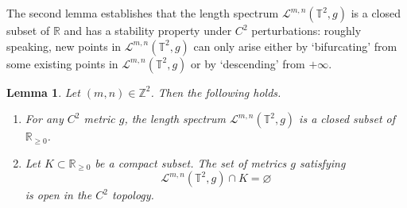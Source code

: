 \documentclass[11pt,letterpaper,oneside]{amsart}
\newcommand{\Z}{\mathbb{Z}}
\newcommand{\R}{\mathbb{R}}
\newcommand{\T}{\mathbb{T}}
\newtheorem{lemm}[theo]{Lemma}
\theoremstyle{definition}
\theoremstyle{remark}
\theoremstyle{definition}
\theoremstyle{remark}
\newcommand{\CL}{\mathcal{L}}
\begin{document}
The second lemma establishes that the length spectrum $\CL^{m,n}(\T^2, g)$ is a closed subset of $\R$ and has a stability property under $C^2$ perturbations: roughly speaking, new points in $\CL^{m,n}(\T^2, g)$ can only arise either by `bifurcating' from some existing points in $\CL^{m,n}(\T^2, g)$ or by `descending' from $+\infty$.

\begin{lemm}\label{lem:LSP stability}
    Let $(m,n) \in \Z^2$. 
    Then the following holds.
    \begin{enumerate}
        \item For any $C^2$ metric $g$, the length spectrum $\CL^{m,n}(\T^2, g)$ is a closed subset of $\R_{\geq 0}$.
        \item Let $K \subset \R_{\geq 0}$ be a compact subset. The set of metrics $g$ satisfying
        \begin{equation*}
            \CL^{m,n}(\T^2, g) \cap K = \varnothing
        \end{equation*}
        is open in the $C^2$ topology.
    \end{enumerate}
\end{lemm}
\end{document}
